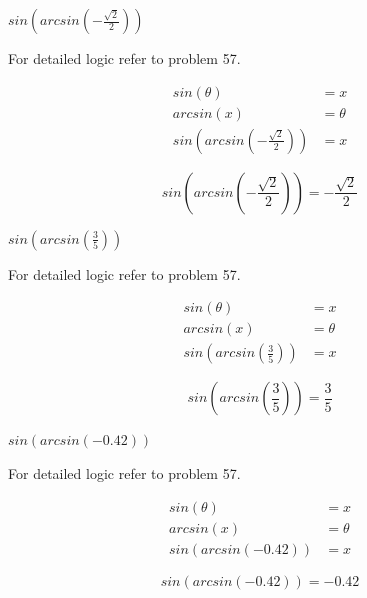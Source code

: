 \documentclass[10pt,letterpaper]{amspset}
\begin{document}
\begin{problem}[58]
    $sin \left(arcsin \left( -\frac{\sqrt{2}}{2} \right)\right)$
\end{problem}

\begin{solution}
    For detailed logic refer to problem 57. 
    
    \begin{align}
        sin(\theta) &= x \\
        arcsin(x) &= \theta \\
        sin \left(arcsin \left( -\frac{\sqrt{2}}{2} \right)\right) &= x 
    \end{align}
    
    \[\boxed{ sin \left(arcsin \left( -\frac{\sqrt{2}}{2} \right)\right) = -\frac{\sqrt{2}}{2} } \]
\end{solution}


\pagebreak


\begin{problem}[59]
    $sin \left(arcsin \left( \frac{3}{5} \right)\right)$
\end{problem}

\begin{solution}
    For detailed logic refer to problem 57. 
    
    \begin{align}
        sin(\theta) &= x \\
        arcsin(x) &= \theta \\
        sin \left(arcsin \left( \frac{3}{5} \right)\right) &= x 
    \end{align}
    
    \[\boxed{ sin \left(arcsin \left( \frac{3}{5} \right)\right) = \frac{3}{5} } \]
\end{solution}


\begin{problem}[60]
    $sin \left(arcsin \left( -0.42 \right)\right)$
\end{problem}

\begin{solution}
    For detailed logic refer to problem 57. 
    
    \begin{align}
        sin(\theta) &= x \\
        arcsin(x) &= \theta \\
        sin \left(arcsin \left( -0.42 \right)\right) &= x 
    \end{align}
    
    \[\boxed{ sin \left(arcsin \left( -0.42 \right)\right) = -0.42 } \]
\end{solution}
\end{document}
